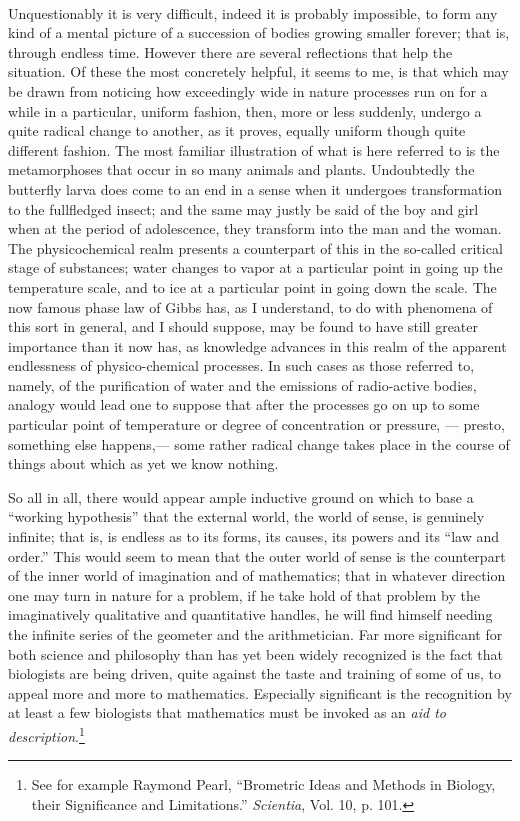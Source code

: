 \documentclass[a4paper, 11pt, oneside, polutonikogreek, english, landscape]{article}
\begin{document}
\paragraph{}
Unquestionably it is very difficult, indeed it is probably impossible, to form any kind of a mental picture of a succession of bodies growing smaller forever; that is, through endless time. However there are several reflections that help the situation. Of these the most concretely helpful, it seems to me, is that which may be drawn from noticing how exceedingly wide in nature processes run on for a while in a particular, uniform fashion, then, more or less suddenly, undergo a quite radical change to another, as it proves, equally uniform though quite different fashion. The most familiar illustration of what is here referred to is the metamorphoses that occur in so many animals and plants. Undoubtedly the butterfly larva does come to an end in a sense when it undergoes transformation to the fullfledged insect; and the same may justly be said of the boy and girl when at the period of adolescence, they transform into the man and the woman. The physicochemical realm presents a counterpart of this in the so-called critical stage of substances; water changes to vapor at a particular point in going up the temperature scale, and to ice at a particular point in going down the scale. The now famous phase law of Gibbs has, as I understand, to do with phenomena of this sort in general, and I should suppose, may be found to have still greater importance than it now has, as knowledge advances in this realm of the apparent endlessness of physico-chemical processes. In such cases as those referred to, namely, of the purification of water and the emissions of radio-active bodies, analogy would lead one to suppose that after the processes go on up to some particular point of temperature or degree of concentration or pressure, --- presto, something else happens,--- some rather radical change takes place in the course of things about which as yet we know nothing.

So all in all, there would appear ample inductive ground on which to base a ``working hypothesis'' that the external world, the world of sense, is genuinely infinite; that is, is endless as to its forms, its causes, its powers and its ``law and order.'' This would seem to mean that the outer world of sense is the counterpart of the inner world of imagination and of mathematics; that in whatever direction one may turn in nature for a problem, if he take hold of that problem by the imaginatively qualitative and quantitative handles, he will find himself needing the infinite series of the geometer and the arithmetician. Far more significant for both science and philosophy than has yet been widely recognized is the fact that biologists are being driven, quite against the taste and training of some of us, to appeal more and more to mathematics. Especially significant is the recognition by at least a few biologists that mathematics must be invoked as an \emph{aid to description}.\footnote{See for example Raymond Pearl, ``Brometric Ideas and Methods in Biology, their Significance and Limitations.'' \emph{Scientia}, Vol. 10, p. 101.}
\end{document}

